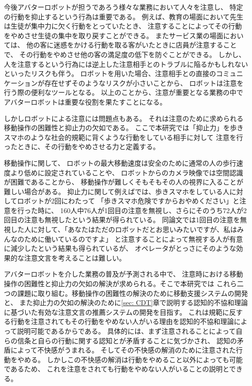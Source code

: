 \documentclass{kuisthesis}
\begin{document}
今後アバターロボットが担うであろう様々な業務において人々を注意し、
特定の行動を抑止するという行為は重要である。
例えば、教育の場面において先生は生徒が集中力に欠く行動をとっていたとき、
注意することによってその行動をやめさせ生徒の集中を取り戻すことができる。
またサービス業の場面においては、
他の客に迷惑をかける行動を取る客がいたときに店員が注意することで、
その行動をやめさせ他の客の満足度の低下を防ぐことができる。
しかし、人を注意するという行為には逆上した注意相手とのトラブルに陥るかもしれないといったリスクも伴う。
ロボットを用いた場合、注意相手との直接のコミュニケーションが存在せずそのようなリスクが小さいことから、
ロボットは注意を行う際の便利なツールとなる。
以上のことから、注意が重要となる業務の中でアバターロボットは重要な役割を果たすことになる。

しかしロボットによる注意には問題点もある。
それは注意のために求められる移動操作の困難性と抑止力の欠如である。
ここで本研究では「抑止力」を歩きスマホのような社会的規範に背くような行動をしている相手に対して
注意を行ったときに、その行動をやめさせる力と定義する。

移動操作に関して、
ロボットの最大移動速度は安全のために通常の人の歩行速度より低めに設定されていることや、
ロボットからのカメラ映像では空間認識が困難であることから、
移動操作が難しくそもそもその人の視界に入ることが難しい場合がある。
抑止力に関して例えば\cite{Schneider2022}では、歩きスマホをしている人に対してロボットが2回にわたって
「歩きスマホ危険ですからおやめください」と注意を行った時に、
160人中76人が1回目の注意を無視し、さらにそのうち72人が2回目の注意も無視したという結果が得られている。
同論文では1回目の注意を無視した人に対して、「あなたはただのロボットだとお思いみたいですが、私はみんなのために働いているのですよ」
と注意することによって無視する人が有意に減少したという結果も得られているが、
オペレータがとっさにそのような効果的な注意文言を考えることは難しい。

アバターロボットを介した業務の普及が予測される中で、
注意時における移動操作の困難性と抑止力の欠如の解決が求められる。そこで本研究では
これら二つの課題に取り組む。移動操作の困難性の解決のために移動支援システムの開発と、
また抑止力の欠如の解決のために\ref{sec: CDT}章で説明する認知的不協和理論\cite{Festinger1957}に基づいた有効な注意文言の推薦システムの開発を目指す。
これは規範に反する行動を注意されてもその行動をやめない人がいる理由を認知的不協和理論によって説明可能であるからである。
具体的には、まず注意されることによって自らの信条と自らの行動に関する認知とが矛盾することに気づかされ、
認知の矛盾によって不快感がうまれる。
そしてその不快感の解消のために注意された行動をやめる。
しかしこの不快感の解消は行動をやめること以外によっても可能であるため、
これを注意をされても行動をやめない人がいることの説明とできる。
\end{document}
